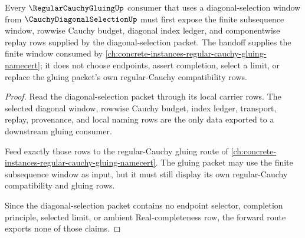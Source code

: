 \begin{theorem}
\label{thm:cauchy-diagonal-selection-regular-cauchy-gluing-forward-route}
Every $\RegularCauchyGluingUp$ consumer that uses a diagonal-selection window from $\CauchyDiagonalSelectionUp$ must first expose the finite subsequence window, rowwise Cauchy budget, diagonal index ledger, and componentwise replay rows supplied by the diagonal-selection packet. The handoff supplies the finite window consumed by \autoref{ch:concrete-instances-regular-cauchy-gluing-namecert}; it does not choose endpoints, assert completion, select a limit, or replace the gluing packet's own regular-Cauchy compatibility rows.
\end{theorem}
\begin{proof}
Read the diagonal-selection packet through its local carrier rows. The selected diagonal window, rowwise Cauchy budget, index ledger, transport, replay, provenance, and local naming rows are the only data exported to a downstream gluing consumer.

Feed exactly those rows to the regular-Cauchy gluing route of \autoref{ch:concrete-instances-regular-cauchy-gluing-namecert}. The gluing packet may use the finite subsequence window as input, but it must still display its own regular-Cauchy compatibility and gluing rows.

Since the diagonal-selection packet contains no endpoint selector, completion principle, selected limit, or ambient Real-completeness row, the forward route exports none of those claims.
\end{proof}

